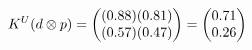 \documentclass[preview]{standalone}
\begin{document}
\begin{align*}
\special{dvisvgm:raw <g id='unique000'>}K^U(d \otimes p) = \begin{pmatrix} (0.88)(0.81) \\ (0.57)(0.47) \end{pmatrix} = \begin{pmatrix} 0.71 \\ 0.26 \end{pmatrix}\special{dvisvgm:raw </g>}
\end{align*}
\end{document}
